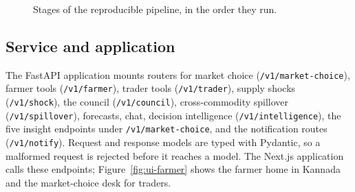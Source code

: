 \begin{figure}[!t]
\centering
{}
\caption{Stages of the reproducible pipeline, in the order they run.}
\label{fig:integration-flow}
\end{figure}

\subsection{Service and application}
\label{sec:service-app}

The FastAPI application mounts routers for market choice (\texttt{/v1/market-choice}), farmer tools (\texttt{/v1/farmer}), trader tools (\texttt{/v1/trader}), supply shocks (\texttt{/v1/shock}), the council (\texttt{/v1/council}), cross-commodity spillover (\texttt{/v1/spillover}), forecasts, chat, decision intelligence (\texttt{/v1/intelligence}), the five insight endpoints under \texttt{/v1/market-choice}, and the notification routes (\texttt{/v1/notify}). Request and response models are typed with Pydantic, so a malformed request is rejected before it reaches a model. The Next.js application calls these endpoints; Figure~\ref{fig:ui-farmer} shows the farmer home in Kannada and the market-choice desk for traders.

